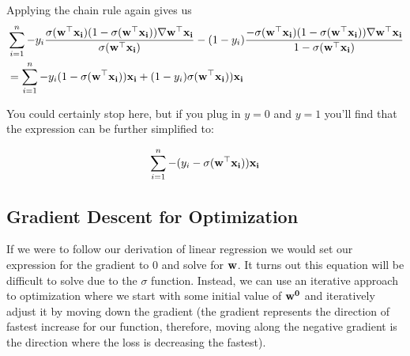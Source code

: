 \documentclass[assignment03_Solutions]{subfiles}
\begin{document}
\begin{exercise}[(60 minutes)]
\begin{boxedsolution}
Applying the chain rule again gives us
\begin{align}
& \sum_{i=1}^n -y_i \frac{\sigma( \mathbf{w}^\top \mathbf{x_i})(1-\sigma( \mathbf{w}^\top \mathbf{x_i}))\nabla \mathbf{w}^\top \mathbf{x_i}}{\sigma( \mathbf{w}^\top \mathbf{x_i})} - (1-y_i) \frac{- \sigma( \mathbf{w}^\top \mathbf{x_i})(1-\sigma( \mathbf{w}^\top \mathbf{x_i}))\nabla \mathbf{w}^\top \mathbf{x_i}}{1 - \sigma( \mathbf{w}^\top \mathbf{x_i})} \nonumber \\
 &= \sum_{i=1}^n -y_i (1-\sigma( \mathbf{w}^\top \mathbf{x_i}))\mathbf{x_i} + (1-y_i)  \sigma( \mathbf{w}^\top \mathbf{x_i})) \mathbf{x_i} 
 \end{align}
 
You could certainly stop here, but if you plug in $y=0$ and $y=1$ you'll find that the expression can be further simplified to:
 
 \begin{align}
\sum_{i=1}^n  -(y_i - \sigma(\mathbf{w}^\top \mathbf{x_i})) \mathbf{x_i} \nonumber
 \end{align}


\end{boxedsolution}

\ees
\end{exercise}


\subsection{Gradient Descent for Optimization}
If we were to follow our derivation of linear regression we would set our expression for the gradient to 0 and solve for $\mathbf{w}$.  It turns out this equation will be difficult to solve due to the $\sigma$ function.  Instead, we can use an iterative approach to optimization where we start with some initial value of $\mathbf{w^0}$ and iteratively adjust it by moving down the gradient (the gradient represents the direction of fastest increase for our function, therefore, moving along the negative gradient is the direction where the loss is decreasing the fastest).
\end{document}
